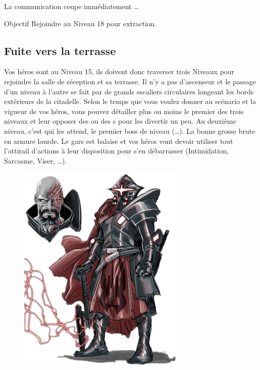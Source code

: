 La communication coupe immédiatement \dots

\begin{paperbox}{Objectif}
Rejoindre  au Niveau 18 pour extraction.
\end{paperbox}

\newpage

\subsection{Fuite vers la terrasse}

Vos héros sont au Niveau 15, ils doivent donc traverser trois Niveaux pour rejoindre la salle de réception et sa terrasse. Il n’y a pas d’ascenseur et le passage d’un niveau à l’autre se fait par de grands escaliers circulaires longeant les bords extérieurs de la citadelle. Selon le temps que vous voulez donner au scénario et la vigueur de vos héros, vous pouvez détailler plus ou moins le premier des trois niveaux et leur opposer des  ou des s pour les divertir un peu.
\bigbreak
Au deuxième niveau, c’est  qui les attend, le premier boss de niveau (\dots). La bonne grosse brute en armure lourde. Le gars est balaise et vos héros vont devoir utiliser tout l’attirail d’actions à leur disposition pour s’en débarrasser (Intimidation, Sarcasme, Viser, \dots).

\begin{figure}[h]
\noindent\includegraphics[width=\linewidth]{_img/pnjs/bombinax.png}
\caption{}
\end{figure}

